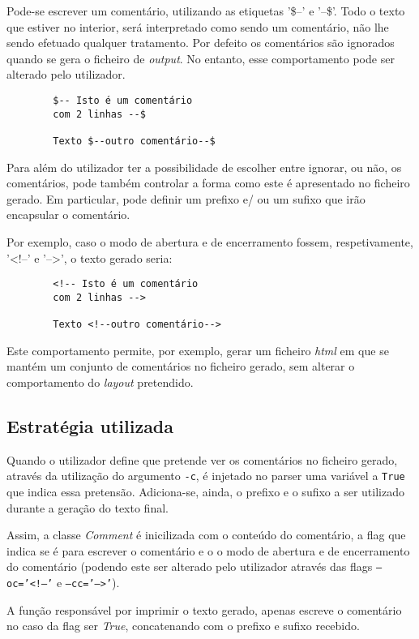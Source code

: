 \documentclass[../relatorio.tex]{subfiles}
\begin{document}
    Pode-se escrever um comentário, utilizando as etiquetas '\$--' e '--\$'.
    Todo o texto que estiver no interior, será interpretado como sendo um comentário,
    não lhe sendo efetuado qualquer tratamento.
    Por defeito os comentários são ignorados quando se gera o ficheiro de \textit{output}.
    No entanto, esse comportamento pode ser alterado pelo utilizador.

    \begin{verbatim}
        $-- Isto é um comentário
        com 2 linhas --$

        Texto $--outro comentário--$
    \end{verbatim}

    Para além do utilizador ter a possibilidade de escolher entre ignorar, ou não,
    os comentários, pode também controlar a forma como este é apresentado no ficheiro gerado.
    Em particular, pode definir um prefixo e/ ou um sufixo que irão encapsular o comentário.

    Por exemplo, caso o modo de abertura e de 
    encerramento fossem, respetivamente, '<!--' e '-->', o texto gerado seria:

    \begin{verbatim}
        <!-- Isto é um comentário
        com 2 linhas -->

        Texto <!--outro comentário-->
    \end{verbatim}

    Este comportamento permite, por exemplo, gerar um ficheiro \textit{html}
    em que se mantém um conjunto de comentários no ficheiro gerado, sem alterar o 
    comportamento do \textit{layout} pretendido.

    \subsection*{Estratégia utilizada}

    Quando o utilizador define que pretende ver os comentários no ficheiro gerado,
    através da utilização do argumento \texttt{-c}, é injetado
    no parser uma variável a \texttt{True} que indica essa pretensão.
    Adiciona-se, ainda, o prefixo e o sufixo a ser utilizado durante a geração do texto
    final.

    Assim, a classe \textit{Comment} é inicilizada com o conteúdo do comentário,
    a flag que indica se é para escrever o comentário e o 
    o modo de abertura e de encerramento do comentário (podendo este ser alterado pelo
    utilizador através das flags \texttt{--oc='<!--'} e \texttt{--cc='-->'}).

    A função responsável por imprimir o texto gerado, apenas escreve o
    comentário no caso da flag ser \textit{True}, concatenando com o prefixo
    e sufixo recebido.
\end{document}
